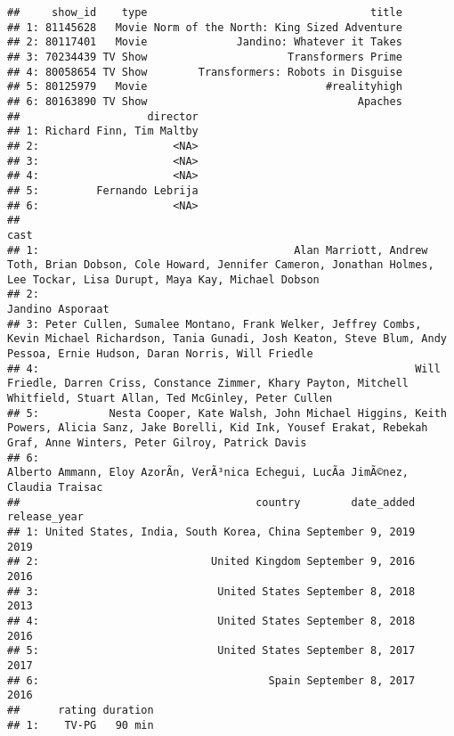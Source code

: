\documentclass[]{article}
\begin{document}
\begin{verbatim}
##     show_id    type                                   title
## 1: 81145628   Movie Norm of the North: King Sized Adventure
## 2: 80117401   Movie              Jandino: Whatever it Takes
## 3: 70234439 TV Show                      Transformers Prime
## 4: 80058654 TV Show        Transformers: Robots in Disguise
## 5: 80125979   Movie                            #realityhigh
## 6: 80163890 TV Show                                 Apaches
##                    director
## 1: Richard Finn, Tim Maltby
## 2:                     <NA>
## 3:                     <NA>
## 4:                     <NA>
## 5:         Fernando Lebrija
## 6:                     <NA>
##                                                                                                                                                                                  cast
## 1:                                        Alan Marriott, Andrew Toth, Brian Dobson, Cole Howard, Jennifer Cameron, Jonathan Holmes, Lee Tockar, Lisa Durupt, Maya Kay, Michael Dobson
## 2:                                                                                                                                                                   Jandino Asporaat
## 3: Peter Cullen, Sumalee Montano, Frank Welker, Jeffrey Combs, Kevin Michael Richardson, Tania Gunadi, Josh Keaton, Steve Blum, Andy Pessoa, Ernie Hudson, Daran Norris, Will Friedle
## 4:                                                           Will Friedle, Darren Criss, Constance Zimmer, Khary Payton, Mitchell Whitfield, Stuart Allan, Ted McGinley, Peter Cullen
## 5:           Nesta Cooper, Kate Walsh, John Michael Higgins, Keith Powers, Alicia Sanz, Jake Borelli, Kid Ink, Yousef Erakat, Rebekah Graf, Anne Winters, Peter Gilroy, Patrick Davis
## 6:                                                                                                  Alberto Ammann, Eloy AzorÃ­n, VerÃ³nica Echegui, LucÃ­a JimÃ©nez, Claudia Traisac
##                                     country        date_added release_year
## 1: United States, India, South Korea, China September 9, 2019         2019
## 2:                           United Kingdom September 9, 2016         2016
## 3:                            United States September 8, 2018         2013
## 4:                            United States September 8, 2018         2016
## 5:                            United States September 8, 2017         2017
## 6:                                    Spain September 8, 2017         2016
##      rating duration
## 1:    TV-PG   90 min

\end{verbatim}
\end{document}
